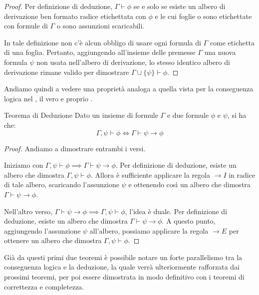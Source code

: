 \begin{proof}
  Per definizione di deduzione, \(\Gamma \vdash \phi\) se e solo se esiste un albero di derivazione ben formato radice etichettata con \(\phi\) e le cui foglie o sono etichettate con formule di \(\Gamma\) o sono assunzioni scaricabili. 

  In tale definizione non c'è alcun obbligo di usare ogni formula di \(\Gamma\) come etichetta di una foglia. Pertanto, aggiungendo all'insieme delle premesse \(\Gamma\) una nuova formula \(\psi\) non usata nell'albero di derivazione, lo stesso identico albero di derivazione rimane valido per dimostrare \(\Gamma \cup \{\psi\} \vdash \phi\).
\end{proof}

Andiamo quindi a vedere una proprietà analoga a quella vista per la conseguenza logica nel , il vero e proprio .

\begin{theorem}[namedlabel={thm:deduction}{Teorema di Deduzione}]{Teorema di Deduzione}
  Dato un insieme di formule \(\Gamma\) e due formule \(\phi\) e \(\psi\), si ha che:
  \[\Gamma, \psi \vdash \phi \iff \Gamma \vdash \psi \to \phi\]
\end{theorem}

\begin{proof}
  Andiamo a dimostrare entrambi i versi.
  
  Iniziamo con \(\Gamma, \psi \vdash \phi \implies \Gamma \vdash \psi \to \phi\).
  Per definizione di deduzione, esiste un albero che dimostra \(\Gamma, \psi \vdash \phi\). Allora è sufficiente applicare la regola \(\to I\) in radice di tale albero, scaricando l'assunzione \(\psi\) e ottenendo così un albero che dimostra \(\Gamma \vdash \psi \to \phi\).

  Nell'altro verso, \(\Gamma \vdash \psi \to \phi \implies \Gamma, \psi \vdash \phi\), l'idea è duale.
  Per definizione di deduzione, esiste un albero che dimostra \(\Gamma \vdash \psi \to \phi\). A questo punto, aggiungendo l'assunzione \(\psi\) all'albero, possiamo applicare la regola \(\to E\) per ottenere un albero che dimostra \(\Gamma, \psi \vdash \phi\).
\end{proof}

Già da questi primi due teoremi è possibile notare un forte parallelismo tra la conseguenza logica e la deduzione, la quale verrà ulteriormente rafforzata dai prossimi teoremi, per poi essere dimostrata in modo definitivo con i teoremi di correttezza e completezza.

